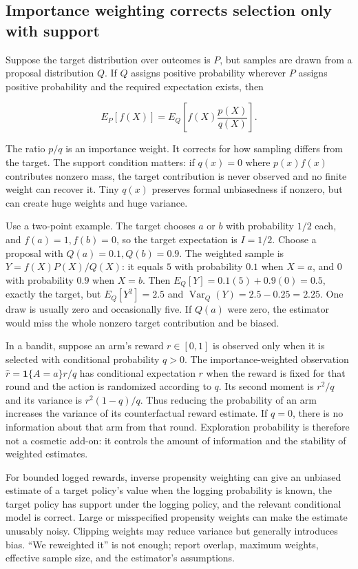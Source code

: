 \subsection{Importance weighting corrects selection only with support}\label{03-visual-computing-i-ch012-importance-weighting-corrects-selection-only-with-support}

Suppose the target distribution over outcomes is \(P\), but samples are drawn from a proposal distribution \(Q\). If \(Q\) assigns positive probability wherever \(P\) assigns positive probability and the required expectation exists, then

\[
E_P[f(X)]=E_Q\left[f(X)\frac{p(X)}{q(X)}\right].
\]

The ratio \(p/q\) is an importance weight. It corrects for how sampling differs from the target. The support condition matters: if \(q(x)=0\) where \(p(x)f(x)\) contributes nonzero mass, the target contribution is never observed and no finite weight can recover it. Tiny \(q(x)\) preserves formal unbiasedness if nonzero, but can create huge weights and huge variance.

Use a two-point example. The target chooses \(a\) or \(b\) with probability \(1/2\) each, and \(f(a)=1,f(b)=0\), so the target expectation is \(I=1/2\). Choose a proposal with \(Q(a)=0.1,Q(b)=0.9\). The weighted sample is \(Y=f(X)P(X)/Q(X)\): it equals \(5\) with probability \(0.1\) when \(X=a\), and \(0\) with probability \(0.9\) when \(X=b\). Then \(E_Q[Y]=0.1(5)+0.9(0)=0.5\), exactly the target, but \(E_Q[Y^2]=2.5\) and \(\operatorname{Var}_Q(Y)=2.5-0.25=2.25\). One draw is usually zero and occasionally five. If \(Q(a)\) were zero, the estimator would miss the whole nonzero target contribution and be biased.

In a bandit, suppose an arm's reward \(r\in[0,1]\) is observed only when it is selected with conditional probability \(q>0\). The importance-weighted observation \(\hat r=\mathbf 1\{A=a\}r/q\) has conditional expectation \(r\) when the reward is fixed for that round and the action is randomized according to \(q\). Its second moment is \(r^2/q\) and its variance is \(r^2(1-q)/q\). Thus reducing the probability of an arm increases the variance of its counterfactual reward estimate. If \(q=0\), there is no information about that arm from that round. Exploration probability is therefore not a cosmetic add-on: it controls the amount of information and the stability of weighted estimates.

For bounded logged rewards, inverse propensity weighting can give an unbiased estimate of a target policy's value when the logging probability is known, the target policy has support under the logging policy, and the relevant conditional model is correct. Large or misspecified propensity weights can make the estimate unusably noisy. Clipping weights may reduce variance but generally introduces bias. ``We reweighted it'' is not enough; report overlap, maximum weights, effective sample size, and the estimator's assumptions.

